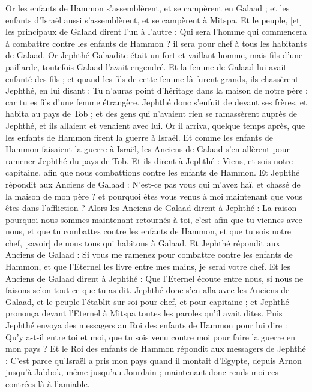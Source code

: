 \begin{multicols}{2}
Or les enfants de Hammon s'assemblèrent, et se campèrent en Galaad ; et les enfants d'Israël aussi s'assemblèrent, et se campèrent à Mitspa.
Et le peuple, [et] les principaux de Galaad dirent l'un à l'autre : Qui sera l'homme qui commencera à combattre contre les enfants de Hammon ? il sera pour chef à tous les habitants de Galaad.
\VerseOne{}Or Jephthé Galaadite était un fort et vaillant homme, mais fils d'une paillarde, toutefois Galaad l'avait engendré.
Et la femme de Galaad lui avait enfanté des fils ; et quand les fils de cette femme-là furent grands, ils chassèrent Jephthé, en lui disant : Tu n'auras point d'héritage dans la maison de notre père ; car tu es fils d'une femme étrangère.
Jephthé donc s'enfuit de devant ses frères, et habita au pays de Tob ; et des gens qui n'avaient rien se ramassèrent auprès de Jephthé, et ils allaient et venaient avec lui.
Or il arriva, quelque temps après, que les enfants de Hammon firent la guerre à Israël.
Et comme les enfants de Hammon faisaient la guerre à Israël, les Anciens de Galaad s'en allèrent pour ramener Jephthé du pays de Tob.
Et ils dirent à Jephthé : Viens, et sois notre capitaine, afin que nous combattions contre les enfants de Hammon.
Et Jephthé répondit aux Anciens de Galaad : N'est-ce pas vous qui m'avez haï, et chassé de la maison de mon père ? et pourquoi êtes vous venus à moi maintenant que vous êtes dans l'affliction ?
Alors les Anciens de Galaad dirent à Jephthé : La raison pourquoi nous sommes maintenant retournés à toi, c'est afin que tu viennes avec nous, et que tu combattes contre les enfants de Hammon, et que tu sois notre chef, [savoir] de nous tous qui habitons à Galaad.
Et Jephthé répondit aux Anciens de Galaad : Si vous me ramenez pour combattre contre les enfants de Hammon, et que l'Eternel les livre entre mes mains, je serai votre chef.
Et les Anciens de Galaad dirent à Jephthé : Que l'Eternel écoute entre nous, si nous ne faisons selon tout ce que tu as dit.
Jephthé donc s'en alla avec les Anciens de Galaad, et le peuple l'établit sur soi pour chef, et pour capitaine ; et Jephthé prononça devant l'Eternel à Mitspa toutes les paroles qu'il avait dites.
Puis Jephthé envoya des messagers au Roi des enfants de Hammon pour lui dire : Qu'y a-t-il entre toi et moi, que tu sois venu contre moi pour faire la guerre en mon pays ?
Et le Roi des enfants de Hammon répondit aux messagers de Jephthé : C'est parce qu'Israël a pris mon pays quand il montait d'Egypte, depuis Arnon jusqu'à Jabbok, même jusqu'au Jourdain ; maintenant donc rends-moi ces contrées-là à l'amiable.

\end{multicols}
